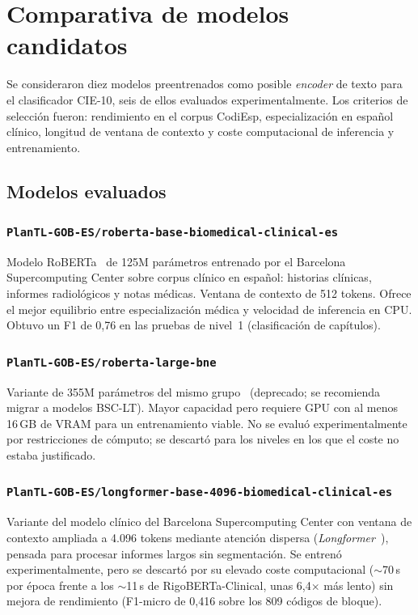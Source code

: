 \chapter{Comparativa de modelos candidatos}
\label{cap:AnexoA}

Se consideraron diez modelos preentrenados como posible \emph{encoder} de texto para el clasificador CIE-10, seis de ellos evaluados experimentalmente. Los criterios de selección fueron: rendimiento en el corpus CodiEsp, especialización en español clínico, longitud de ventana de contexto y coste computacional de inferencia y entrenamiento.

\section{Modelos evaluados}

\subsection{\texttt{PlanTL-GOB-ES/roberta-base-biomedical-clinical-es}}

Modelo RoBERTa~\cite{liu2019roberta} de 125M parámetros entrenado por el Barcelona Supercomputing Center sobre corpus clínico en español: historias clínicas, informes radiológicos y notas médicas. Ventana de contexto de 512 tokens. Ofrece el mejor equilibrio entre especialización médica y velocidad de inferencia en CPU. Obtuvo un F1 de 0{,}76 en las pruebas de nivel~1 (clasificación de capítulos).

\subsection{\texttt{PlanTL-GOB-ES/roberta-large-bne}}

Variante de 355M parámetros del mismo grupo~\cite{liu2019roberta} (deprecado; se recomienda migrar a modelos BSC-LT). Mayor capacidad pero requiere GPU con al menos 16\,GB de VRAM para un entrenamiento viable. No se evaluó experimentalmente por restricciones de cómputo; se descartó para los niveles en los que el coste no estaba justificado.

\subsection{\texttt{PlanTL-GOB-ES/longformer-base-4096-biomedical-clinical-es}}

Variante del modelo clínico del Barcelona Supercomputing Center con ventana de contexto ampliada a 4.096 tokens mediante atención dispersa (\emph{Longformer}~\cite{beltagy2020longformer}), pensada para procesar informes largos sin segmentación. Se entrenó experimentalmente, pero se descartó por su elevado coste computacional ($\sim$70\,s por época frente a los $\sim$11\,s de RigoBERTa-Clinical, unas 6,4$\times$ más lento) sin mejora de rendimiento (F1-micro de 0{,}416 sobre los 809 códigos de bloque).

